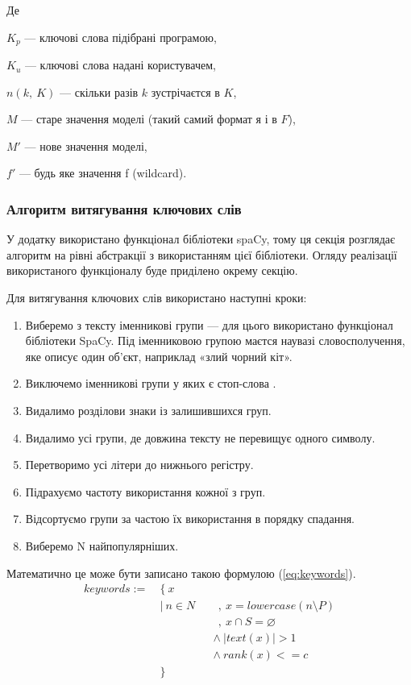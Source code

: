 \documentclass[14pt]{extarticle}
\begin{document}
  Де

  $K_p$ --- ключові слова підібрані програмою,

  $K_u$ --- ключові слова надані користувачем,

  $n(k,~ K)$ --- скільки разів $k$ зустрічаєтся в $K$,

  $M$ --- старе значення моделі (такий самий формат я і в $F$),

  $M'$ --- нове значення моделі,

  $f'$ --- будь яке значення f (wildcard).

  \subsubsection{Алгоритм витягування ключових слів}
  У додатку використано функціонал бібліотеки spaCy,
  тому ця секція розглядає алгоритм \cite{wiki_algorithm} на рівні абстракції
  \cite{wiki_abstraction,wiki_abstraction_layer}
  з використанням цієї бібліотеки.
  Огляду реалізації використаного функціоналу буде приділено окрему секцію.

  Для витягування ключових слів використано наступні кроки:
  \begin{enumerate}[labelindent=\dimexpr\parindent*2\relax, leftmargin=*]
    \item Виберемо з тексту іменникові групи ---
      для цього використано функціонал бібліотеки SpaCy.
      Під іменниковою групою маєтся наувазі словосполучення,
      яке описує один об'єкт, наприклад «злий чорний кіт».
    \item Виключемо іменникові групи у яких є стоп-слова \cite{wiki_stop_word}.
    \item Видалимо розділови знаки із залишившихся груп.
    \item Видалимо усі групи, де довжина тексту не перевищує одного символу.
    \item Перетворимо усі літери до нижнього регістру.
    \item Підрахуємо частоту використання кожної з груп.
    \item Відсортуємо групи за частою їх використання в порядку спадання.
    \item Виберемо N найпопулярніших.
  \end{enumerate}

  Математично це може бути записано такою формулою (\ref{eq:keywords}).
  \begin{equation}
    \begin{alignedat}{2}
     keywords := ~&\{~ x \\
                  &|~ n \in N &&~~,  ~ x = lowercase(n \setminus P) \\
                  &           &&~~,  ~ x \cap S = \varnothing \\
                  &           &&\land~ | text(x) | > 1 \\
                  &           &&\land~ rank(x) <= c \\
                  &\}
    \end{alignedat}
    \label{eq:keywords}
  \end{equation}
\end{document}

